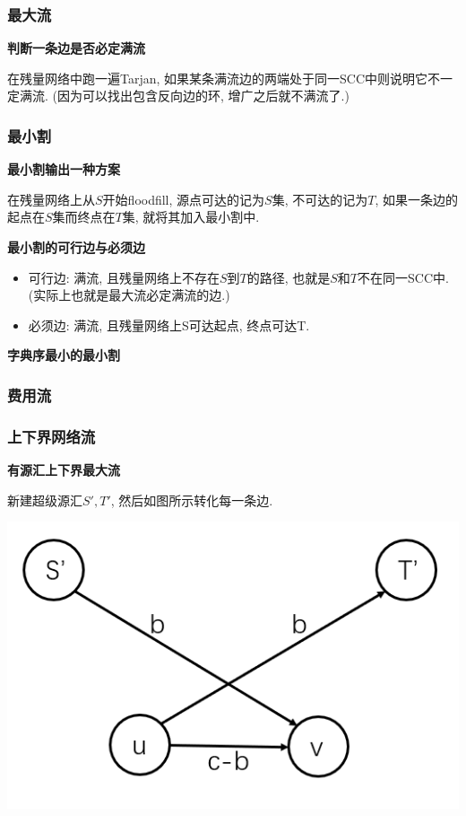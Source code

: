\subsubsection{最大流}

\textbf{判断一条边是否必定满流}

在残量网络中跑一遍Tarjan, 如果某条满流边的两端处于同一SCC中则说明它不一定满流. (因为可以找出包含反向边的环, 增广之后就不满流了.)

\subsubsection{最小割}

\textbf{最小割输出一种方案}

在残量网络上从$S$开始floodfill, 源点可达的记为$S$集, 不可达的记为$T$, 如果一条边的起点在$S$集而终点在$T$集, 就将其加入最小割中.

\textbf{最小割的可行边与必须边}

\begin{itemize}
	\item 可行边: 满流, 且残量网络上不存在$S$到$T$的路径, 也就是$S$和$T$不在同一SCC中. (实际上也就是最大流必定满流的边.)

	\item 必须边: 满流, 且残量网络上S可达起点, 终点可达T.
\end{itemize}

\textbf{字典序最小的最小割}

\subsubsection{费用流}


\subsubsection{上下界网络流}

\textbf{有源汇上下界最大流}

新建超级源汇$S', T'$, 然后如图所示转化每一条边.

\includegraphics[scale = 0.5]{../src/graph/上下界网络流.png}

